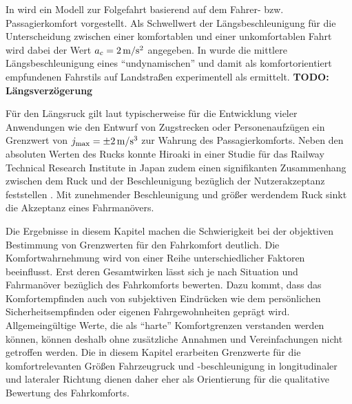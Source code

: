 In \cite{liu und wu} wird ein Modell zur Folgefahrt basierend auf dem Fahrer- bzw. Passagierkomfort vorgestellt. Als Schwellwert der Längsbeschleunigung für die Unterscheidung zwischen einer komfortablen und einer unkomfortablen Fahrt wird dabei der Wert $a_c = 2\,\mathrm{m/s^2}$ angegeben. In \cite{radke} wurde die mittlere Längsbeschleunigung eines ``undynamischen'' und damit als komfortorientiert empfundenen Fahrstils auf Landstraßen experimentell als  ermittelt. 
\textbf{TODO: Längsverzögerung}

Für den Längsruck gilt laut \cite{Fun-to-Drive by Feedback} typischerweise für die Entwicklung vieler Anwendungen wie den Entwurf von Zugstrecken oder Personenaufzügen ein Grenzwert von $j_{\textrm{max}} = \pm2\,\mathrm{m/s^3}$ zur Wahrung des Passagierkomforts. Neben den absoluten Werten des Rucks konnte Hiroaki in einer Studie für das Railway Technical Research Institute in Japan zudem einen signifikanten Zusammenhang zwischen dem Ruck und der Beschleunigung bezüglich der Nutzerakzeptanz feststellen \cite{hiroaki}. Mit zunehmender Beschleunigung und größer werdendem Ruck sinkt die Akzeptanz eines Fahrmanövers.  


Die Ergebnisse in diesem Kapitel machen die Schwierigkeit bei der objektiven Bestimmung von Grenzwerten für den Fahrkomfort deutlich. Die Komfortwahrnehmung wird von einer Reihe unterschiedlicher Faktoren beeinflusst. Erst deren Gesamtwirken lässt sich je nach Situation und Fahrmanöver bezüglich des Fahrkomforts bewerten. Dazu kommt, dass das Komfortempfinden auch von subjektiven Eindrücken wie dem persönlichen Sicherheitsempfinden oder eigenen Fahrgewohnheiten geprägt wird. Allgemeingültige Werte, die als ``harte'' Komfortgrenzen verstanden werden können, können deshalb ohne zusätzliche Annahmen und Vereinfachungen nicht getroffen werden. Die in diesem Kapitel erarbeiten Grenzwerte für die komfortrelevanten Größen Fahrzeugruck und -beschleunigung in longitudinaler und lateraler Richtung dienen daher eher als Orientierung für die qualitative Bewertung des Fahrkomforts.
